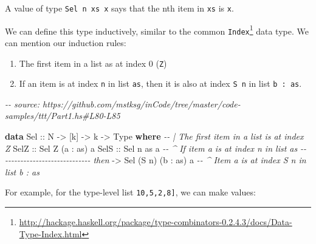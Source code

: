 \documentclass[]{article}
\newenvironment{Shaded}{}{}
\newcommand{\CommentTok}[1]{\textcolor[rgb]{0.38,0.63,0.69}{\textit{#1}}}
\newcommand{\DataTypeTok}[1]{\textcolor[rgb]{0.56,0.13,0.00}{#1}}
\newcommand{\KeywordTok}[1]{\textcolor[rgb]{0.00,0.44,0.13}{\textbf{#1}}}
\newcommand{\NormalTok}[1]{#1}
\newcommand{\OperatorTok}[1]{\textcolor[rgb]{0.40,0.40,0.40}{#1}}
\newcommand{\OtherTok}[1]{\textcolor[rgb]{0.00,0.44,0.13}{#1}}
\renewcommand{\href}[2]{#2\footnote{\url{#1}}}
\begin{document}
A value of type \texttt{Sel\ n\ xs\ x} says that the nth item in \texttt{xs} is
\texttt{x}.

We can define this type inductively, similar to the common
\href{http://hackage.haskell.org/package/type-combinators-0.2.4.3/docs/Data-Type-Index.html}{\texttt{Index}}
data type. We can mention our induction rules:

\begin{enumerate}
\def\labelenumi{\arabic{enumi}.}
\tightlist
\item
  The first item in a list as at index 0 (\texttt{Z})
\item
  If an item is at index \texttt{n} in list \texttt{as}, then it is also at
  index \texttt{S\ n} in list \texttt{b\ \textquotesingle{}:\ as}.
\end{enumerate}

\begin{Shaded}
\begin{Highlighting}[]
\CommentTok{{-}{-} source: https://github.com/mstksg/inCode/tree/master/code{-}samples/ttt/Part1.hs\#L80{-}L85}

\KeywordTok{data} \DataTypeTok{Sel}\OtherTok{ ::} \DataTypeTok{N} \OtherTok{{-}\textgreater{}}\NormalTok{ [k] }\OtherTok{{-}\textgreater{}}\NormalTok{ k }\OtherTok{{-}\textgreater{}} \DataTypeTok{Type} \KeywordTok{where}
    \CommentTok{{-}{-} | The first item in a list is at index \textquotesingle{}\textquotesingle{}Z\textquotesingle{}}
    \DataTypeTok{SelZ}\OtherTok{ ::} \DataTypeTok{Sel} \DataTypeTok{\textquotesingle{}Z}\NormalTok{ (a \textquotesingle{}}\OperatorTok{:}\NormalTok{ as) a}
    \DataTypeTok{SelS}\OtherTok{ ::} \DataTypeTok{Sel}\NormalTok{     n        as  a  }\CommentTok{{-}{-} \^{} If item \textasciigrave{}a\textasciigrave{} is at index \textasciigrave{}n\textasciigrave{} in list \textasciigrave{}as\textasciigrave{}}
         \CommentTok{{-}{-} {-}{-}{-}{-}{-}{-}{-}{-}{-}{-}{-}{-}{-}{-}{-}{-}{-}{-}{-}{-}{-}{-}{-}{-}{-}{-}{-}{-} then}
         \OtherTok{{-}\textgreater{}} \DataTypeTok{Sel}\NormalTok{ (}\DataTypeTok{\textquotesingle{}S}\NormalTok{ n) (b \textquotesingle{}}\OperatorTok{:}\NormalTok{ as) a  }\CommentTok{{-}{-} \^{} Item \textasciigrave{}a\textasciigrave{} is at index \textasciigrave{}S n\textasciigrave{} in list \textasciigrave{}b : as\textasciigrave{}}
\end{Highlighting}
\end{Shaded}

For example, for the type-level list \texttt{\textquotesingle{}{[}10,5,2,8{]}},
we can make values:
\end{document}
